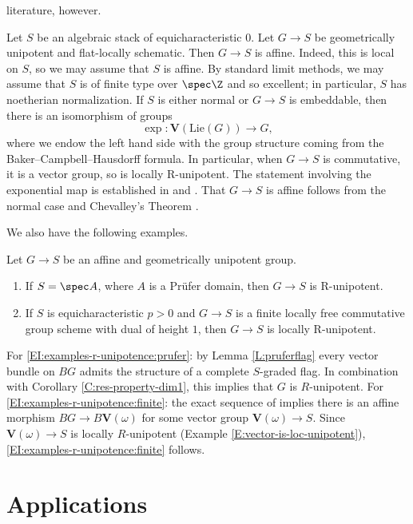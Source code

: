 \documentclass[reqno,a4paper]{amsart}
\numberwithin{Theorem}{section}
\theoremstyle{plain}
\theoremstyle{remark}
\begin{document}
literature, however.
\begin{Example}\label{E:char0-affine} 
  Let $S$ be an algebraic stack of equicharacteristic $0$. Let
  $G \to S$ be geometrically unipotent and flat-locally
  schematic. Then $G \to S$ is affine. Indeed, this is local on $S$,
  so we may assume that $S$ is affine. By standard limit methods, we
  may assume that $S$ is of finite type over $\spec \Z$ and so
  excellent; in particular, $S$ has noetherian normalization. If $S$
  is either normal or $G \to S$ is embeddable, then
  there is an isomorphism of groups
  \[
    \exp \colon \mathbf{V}(\mathrm{Lie}(G)) \to G,
  \]
  where we endow the left hand side with the group structure coming
  from the Baker--Campbell--Hausdorff formula.  In particular, when
  $G \to S$ is commutative, it is a vector group, so is locally
  R-unipotent. The statement involving the exponential map is
  established in \cite[\S1.3]{MR3525845} and
  \cite[XV.3]{Raynaud}. That $G \to S$ is affine follows from the
  normal case and Chevalley's Theorem \cite[Thm.~8.1]{rydh-2009}.
\end{Example}
We also have the following examples.
\begin{Example}\label{E:examples-r-unipotence}
  Let $G \to S$ be an affine and geometrically unipotent group.
  \begin{enumerate}
  \item \label{EI:examples-r-unipotence:prufer} If $S=\spec A$, where $A$ is a Pr\"ufer domain, then $G \to S$
    is R-unipotent.
  \item \label{EI:examples-r-unipotence:finite} If $S$ is equicharacteristic $p>0$ and $G \to S$
  is a finite locally free commutative group scheme with dual of height $1$, then $G \to S$ is locally R-unipotent. 
\end{enumerate}
For \eqref{EI:examples-r-unipotence:prufer}: by Lemma \ref{L:pruferflag} every vector bundle on $BG$ admits the structure of a complete
$S$-graded flag. In combination with Corollary
\ref{C:res-property-dim1}, this implies that $G$ is $R$-unipotent. For \eqref{EI:examples-r-unipotence:finite}:
the exact sequence of \cite[Prop. 1.1]{AMduality} implies there is an
affine morphism $BG \to B\mathbf{V}(\omega)$ for some vector group
$\mathbf{V}(\omega) \to S$. Since $\mathbf{V}(\omega) \to S$ is
locally $R$-unipotent (Example \ref{E:vector-is-loc-unipotent}), \eqref{EI:examples-r-unipotence:finite} follows.
\end{Example}


\section{Applications}
\end{document}
